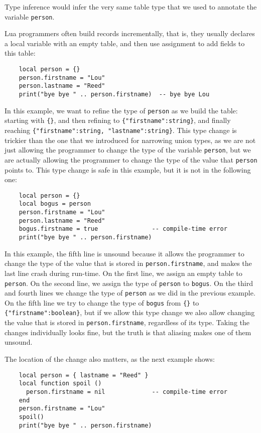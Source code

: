 Type inference would infer the very same table type that we used to
annotate the variable \texttt{person}.

Lua programmers often build records incrementally, that is,
they usually declares a local variable with an empty table,
and then use assignment to add fields to this table:
\begin{verbatim}
    local person = {}
    person.firstname = "Lou"
    person.lastname = "Reed"
    print("bye bye " .. person.firstname)  -- bye bye Lou
\end{verbatim}

In this example, we want to refine the type of \texttt{person} as
we build the table:
starting with \texttt{\{\}}, and then refining to \texttt{\{"firstname":string\}},
and finally reaching \texttt{\{"firstname":string, "lastname":string\}}.
This type change is trickier than the one that we introduced for narrowing
union types, as we are not just allowing the programmer to change
the type of the variable \texttt{person}, but we are actually allowing
the programmer to change the type of the value that \texttt{person} points to.
This type change is safe in this example, but it is not in the following one:
\begin{verbatim}
    local person = {}
    local bogus = person
    person.firstname = "Lou"
    person.lastname = "Reed"
    bogus.firstname = true               -- compile-time error
    print("bye bye " .. person.firstname)
\end{verbatim}

In this example, the fifth line is unsound because it allows the
programmer to change the type of the value that is stored in
\texttt{person.firstname}, and makes the last line crash during
run-time.
On the first line, we assign an empty table to \texttt{person}.
On the second line, we assign the type of \texttt{person} to
\texttt{bogus}.
On the third and fourth lines we change the type of \texttt{person}
as we did in the previous example.
On the fifth line we try to change the type of \texttt{bogus}
from \texttt{\{\}} to \texttt{\{"firstname":boolean\}},
but if we allow this type change we also allow changing the value
that is stored in \texttt{person.firstname}, regardless of its type.
Taking the changes individually looks fine, but the truth is that
aliasing makes one of them unsound.

The location of the change also matters, as the next example shows:
\begin{verbatim}
    local person = { lastname = "Reed" }
    local function spoil ()
      person.firstname = nil             -- compile-time error
    end
    person.firstname = "Lou"
    spoil()
    print("bye bye " .. person.firstname)
\end{verbatim}

